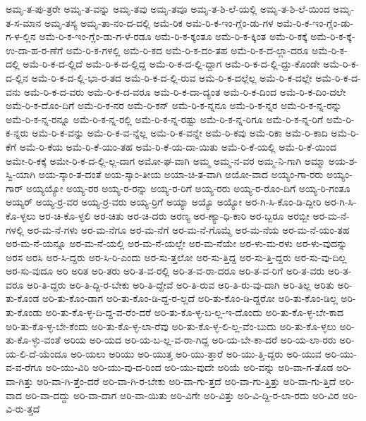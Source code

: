 {ಅಮೃ-ತ-ಪು-ತ್ರರೇ
ಅಮೃ-ತ-ವನ್ನು
ಅಮೃ-ತವು
ಅಮೃ-ತವೂ
ಅಮೃ-ತ-ಶಿ-ಲೆ-ಯಲ್ಲಿ
ಅಮೃ-ತ-ಶಿ-ಲೆ-ಯಿಂದ
ಅಮೃ-ತ-ಸ-ಮಾನ
ಅಮೃ-ತಸ್ಯ
ಅಮೃ-ತಾ-ನಂ-ದ-ದಲ್ಲಿ
ಅಮೆ-ರಿಕ
ಅಮೆ-ರಿ-ಕ-ಇಂ-ಗ್ಲೆಂ-ಡು-ಗಳ
ಅಮೆ-ರಿ-ಕ-ಇಂ-ಗ್ಲೆಂ-ಡು-ಗ-ಳ-ಲ್ಲಿನ
ಅಮೆ-ರಿ-ಕ-ಇಂ-ಗ್ಲೆಂ-ಡು-ಗ-ಳೆ-ರಡೂ
ಅಮೆ-ರಿ-ಕ-ಕ್ಕಂತೂ
ಅಮೆ-ರಿ-ಕ-ಕ್ಕಿಂತ
ಅಮೆ-ರಿ-ಕಕ್ಕೆ
ಅಮೆ-ರಿ-ಕ-ಕ್ಕೆ-ಉ-ದಾ-ಹ-ರ-ಣೆಗೆ
ಅಮೆ-ರಿ-ಕ-ಗಳಲ್ಲಿ
ಅಮೆ-ರಿ-ಕದ
ಅಮೆ-ರಿ-ಕ-ದಂ-ತಹ
ಅಮೆ-ರಿ-ಕ-ದ-ಲ್ಲಾ-ದರೂ
ಅಮೆ-ರಿ-ಕ-ದಲ್ಲಿ
ಅಮೆ-ರಿ-ಕ-ದ-ಲ್ಲಿದೆ
ಅಮೆ-ರಿ-ಕ-ದ-ಲ್ಲಿದ್ದ
ಅಮೆ-ರಿ-ಕ-ದ-ಲ್ಲಿ-ದ್ದಾಗ
ಅಮೆ-ರಿ-ಕ-ದ-ಲ್ಲಿ-ದ್ದು-ಕೊಂಡೇ
ಅಮೆ-ರಿ-ಕ-ದ-ಲ್ಲಿನ
ಅಮೆ-ರಿ-ಕ-ದ-ಲ್ಲಿ-ಭಾ-ರ-ತದ
ಅಮೆ-ರಿ-ಕ-ದ-ಲ್ಲಿ-ರುವ
ಅಮೆ-ರಿ-ಕ-ದಲ್ಲೆಲ್ಲ
ಅಮೆ-ರಿ-ಕ-ದಲ್ಲೇ
ಅಮೆ-ರಿ-ಕ-ದ-ವನು
ಅಮೆ-ರಿ-ಕ-ದ-ವರು
ಅಮೆ-ರಿ-ಕ-ದ-ವರೂ
ಅಮೆ-ರಿ-ಕ-ದಾ-ದ್ಯಂತ
ಅಮೆ-ರಿ-ಕ-ದಿಂದ
ಅಮೆ-ರಿ-ಕ-ದಿಂ-ದಲೇ
ಅಮೆ-ರಿ-ಕ-ದೊಂ-ದಿಗೆ
ಅಮೆ-ರಿ-ಕ-ನರ
ಅಮೆ-ರಿ-ಕನ್
ಅಮೆ-ರಿ-ಕ-ನ್ನನೂ
ಅಮೆ-ರಿ-ಕ-ನ್ನರ
ಅಮೆ-ರಿ-ಕ-ನ್ನ-ರನ್ನು
ಅಮೆ-ರಿ-ಕ-ನ್ನ-ರನ್ನೂ
ಅಮೆ-ರಿ-ಕ-ನ್ನ-ರಲ್ಲಿ
ಅಮೆ-ರಿ-ಕ-ನ್ನ-ರಷ್ಟು
ಅಮೆ-ರಿ-ಕ-ನ್ನ-ರಿಗೂ
ಅಮೆ-ರಿ-ಕ-ನ್ನ-ರಿಗೆ
ಅಮೆ-ರಿ-ಕ-ನ್ನರು
ಅಮೆ-ರಿ-ಕ-ವನ್ನು
ಅಮೆ-ರಿ-ಕ-ವ-ನ್ನೆಲ್ಲ
ಅಮೆ-ರಿ-ಕ-ವನ್ನೇ
ಅಮೆ-ರಿ-ಕವು
ಅಮೆ-ರಿಕಾ
ಅಮೆ-ರಿ-ಕಾದಿ
ಅಮೆ-ರಿ-ಕೆಗೆ
ಅಮೆ-ರಿ-ಕೆಯ
ಅಮೆ-ರಿ-ಕೆ-ಯಂ-ತಹ
ಅಮೆ-ರಿ-ಕೆ-ಯ-ದಾ-ಯಿತು
ಅಮೆ-ರಿ-ಕೆ-ಯಲ್ಲಿ
ಅಮೆ-ರಿ-ಕೆ-ಯಿಂದ
ಅಮೇ-ರಿ-ಕಕ್ಕೆ
ಅಮೇ-ರಿ-ಕ-ದ-ಲ್ಲಿ-ಲ್ಲ-ದಾಗ
ಅಮೋ-ಘ-ವಾಗಿ
ಅಮ್ಮ
ಅಮ್ಮ-ನ-ವರ
ಅಮ್ಮ-ನಿ-ಗಾಗಿ
ಅಮ್ಮಾ
ಅಯ-ಶ-ಸ್ವಿ-ಯಾಗಿ
ಅಯ-ಸ್ಕಾಂ-ತ-ದಂತೆ
ಅಯ-ಸ್ಕಾಂ-ತೀಯ
ಅಯಾ-ಚಿ-ತ-ವಾಗಿ
ಅಯೋ-ವಾದ
ಅಯ್ಯಂ-ಗಾ-ರರು
ಅಯ್ಯಂ-ಗಾರ್
ಅಯ್ಯಯ್ಯೋ
ಅಯ್ಯ-ರರ
ಅಯ್ಯ-ರ-ರನ್ನು
ಅಯ್ಯ-ರ-ರಿಗೆ
ಅಯ್ಯ-ರರು
ಅಯ್ಯ-ರ-ರೊಂ-ದಿಗೆ
ಅಯ್ಯ-ರಿ-ಗಂತೂ
ಅಯ್ಯರ್
ಅಯ್ಯ-ರ್ರ-ವರ
ಅಯ್ಯ-ರ್ರ-ವರು
ಅಯ್ಯ-ರ್ರಿಗೆ
ಅಯ್ಯಾ
ಅಯ್ಯೊ
ಅಯ್ಯೋ
ಅರ-ಗಿ-ಸಿ-ಕೊಂ-ಡಿ-ದ್ದೀರಿ
ಅರ-ಗಿ-ಸಿ-ಕೊ-ಳ್ಳಲು
ಅರ-ಚಿ-ಕೊ-ಳ್ಳಲಿ
ಅರ-ಚಿತು
ಅರ-ಚಿ-ದರು
ಅರಣ್ಯ
ಅರ-ಣ್ಯಾ-ಧಿ-ಕಾರಿ
ಅರ-ಬ್ಬರೂ
ಅರಬ್ಬೀ
ಅರ-ಮ-ನೆ-ಗಳಲ್ಲಿ
ಅರ-ಮ-ನೆ-ಗಳು
ಅರ-ಮ-ನೆಗೂ
ಅರ-ಮ-ನೆಗೆ
ಅರ-ಮ-ನೆ-ಗೊಮ್ಮೆ
ಅರ-ಮ-ನೆಯ
ಅರ-ಮ-ನೆ-ಯಂ-ತಹ
ಅರ-ಮ-ನೆ-ಯನ್ನೂ
ಅರ-ಮ-ನೆ-ಯಲ್ಲಿ
ಅರ-ಮ-ನೆ-ಯಲ್ಲೇ
ಅರ-ಮ-ನೆಯೇ
ಅರ-ಳು-ಮ-ರಳು
ಅರ-ಳು-ವುದನ್ನು
ಅರಸ
ಅರಸಿ
ಅರ-ಸಿ-ದ್ದರು
ಅರ-ಸಿ-ರಿ-ಎಂದು
ಅರ-ಸು-ತ್ತಲೋ
ಅರ-ಸು-ತ್ತಿದ್ದ
ಅರ-ಸು-ತ್ತಿ-ದ್ದರು
ಅರ-ಸು-ವು-ದಿಲ್ಲ
ಅರ-ಸು-ವುದೂ
ಅರಿ
ಅರಿತ
ಅರಿ-ತರು
ಅರಿ-ತ-ವ-ರಲ್ಲಿ
ಅರಿ-ತ-ವ-ರಾ-ದರೂ
ಅರಿ-ತ-ವ-ರಿಗೆ
ಅರಿ-ತ-ವರು
ಅರಿ-ತ-ವರೂ
ಅರಿ-ತಿ-ದ್ದರು
ಅರಿ-ತಿ-ದ್ದಿ-ರ-ಬೇಕು
ಅರಿ-ತಿ-ದ್ದೇವೆ
ಅರಿ-ತಿ-ರುವ
ಅರಿ-ತಿ-ರು-ವು-ದಾಗಿ
ಅರಿ-ತಿಲ್ಲ
ಅರಿತು
ಅರಿ-ತು-ಕೊಂಡ
ಅರಿ-ತು-ಕೊಂ-ಡಾಗ
ಅರಿ-ತು-ಕೊಂ-ಡಿ-ದ್ದ-ರ-ಲ್ಲದೆ
ಅರಿ-ತು-ಕೊಂ-ಡಿ-ದ್ದರೋ
ಅರಿ-ತು-ಕೊಂ-ಡಿಲ್ಲ
ಅರಿ-ತು-ಕೊಂಡು
ಅರಿ-ತು-ಕೊ-ಳ್ಳ-ದಿ-ದ್ದ-ವ-ರೆಂ-ದರೆ
ಅರಿ-ತು-ಕೊ-ಳ್ಳ-ಬ-ಲ್ಲ-ಇ-ದೊಂದು
ಅರಿ-ತು-ಕೊ-ಳ್ಳ-ಬೇ-ಕಾದ
ಅರಿ-ತು-ಕೊ-ಳ್ಳ-ಬೇ-ಕೆಂದು
ಅರಿ-ತು-ಕೊ-ಳ್ಳ-ಲಾ-ರೆವು
ಅರಿ-ತು-ಕೊ-ಳ್ಳ-ಲಿ-ಲ್ಲ-ವೆಂ-ಬುದು
ಅರಿ-ತು-ಕೊ-ಳ್ಳಲು
ಅರಿ-ತು-ಕೊ-ಳ್ಳು-ವಂತೆ
ಅರಿಯ
ಅರಿ-ಯದ
ಅರಿ-ಯ-ಬ-ಲ್ಲ-ವ-ರಾ-ಗಿದ್ದ
ಅರಿ-ಯ-ಬೇ-ಕಾ-ದರೆ
ಅರಿ-ಯ-ಲಾ-ರರು
ಅರಿ-ಯ-ಲಿ-ದೆ-ಯೆಂದೂ
ಅರಿ-ಯಲು
ಅರಿಯು
ಅರಿ-ಯುತ್ತ
ಅರಿ-ಯು-ತ್ತಾರೆ
ಅರಿ-ಯು-ತ್ತಿ-ದ್ದರು
ಅರಿ-ಯುವ
ಅರಿ-ಯು-ವ-ವ-ರೆಗೂ
ಅರಿ-ಯು-ವಿರಿ
ಅರಿ-ಯು-ವು-ದ-ರಿಂದ
ಅರಿ-ಯು-ವುದೇ
ಅರಿಯೆ
ಅರಿ-ವನ್ನು
ಅರಿ-ವಾ-ಗ-ತೊಡ
ಅರಿ-ವಾ-ಗಿತ್ತು
ಅರಿ-ವಾ-ಗಿ-ತ್ತೆಂ-ದರೆ
ಅರಿ-ವಾ-ಗಿ-ರ-ಬೇಕು
ಅರಿ-ವಾ-ಗು-ತ್ತದೆ
ಅರಿ-ವಾ-ಗು-ತ್ತಿತ್ತು
ಅರಿ-ವಾ-ಗು-ತ್ತಿದೆ
ಅರಿ-ವಾದ
ಅರಿ-ವಾ-ದದ್ದು
ಅರಿ-ವಾ-ದಾಗ
ಅರಿ-ವಾ-ಯಿತು
ಅರಿ-ವಿಗೇ
ಅರಿ-ವಿತ್ತು
ಅರಿ-ವಿ-ದ್ದಿ-ರ-ಲಾ-ರದು
ಅರಿ-ವಿರ
ಅರಿ-ವಿ-ರು-ತ್ತದೆ
}

